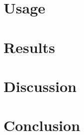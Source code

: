 \section{Usage}

\section{Results}

\section{Discussion}

\section{Conclusion}





\printglossary[type=cdd]
